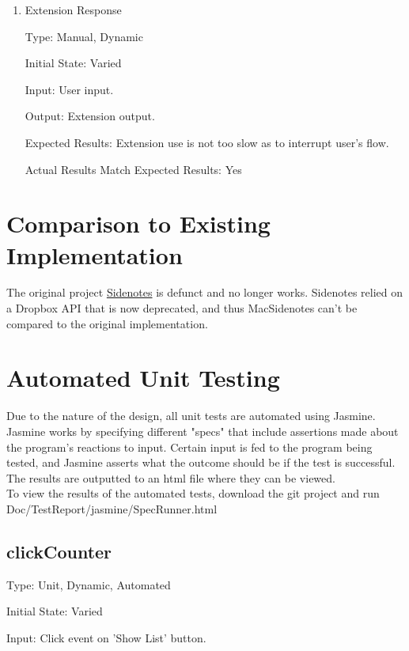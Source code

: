 \documentclass[12pt, titlepage]{article}
\begin{document}
\begin{enumerate}
	
	\item{Extension Response\\}
	
	Type: Manual, Dynamic
	
	Initial State: Varied
	
	Input: User input.
	
	Output: Extension output.
	
	Expected Results: Extension use is not too slow as to interrupt user's flow.
	
	Actual Results Match Expected Results: Yes
	
\end{enumerate}
	
\section{Comparison to Existing Implementation}	

The original project 
\href{https://github.com/sidenotes/sidenotes}{Sidenotes} is defunct and no 
longer works. Sidenotes relied on a Dropbox API that is now deprecated, and 
thus MacSidenotes can't be compared to the original implementation.

\section{Automated Unit Testing}

Due to the nature of the design, all unit tests are automated using Jasmine. 
Jasmine works by specifying different "specs" that include assertions made 
about the program's reactions to input. Certain input is fed to the program 
being tested, and Jasmine asserts what the outcome should be if the test is 
successful. The results are outputted to an html file where they can be 
viewed.\\
To view the results of the automated tests, download the git project and run 
Doc/TestReport/jasmine/SpecRunner.html



\subsection{clickCounter}

	Type: Unit, Dynamic, Automated

	Initial State: Varied

	Input: Click event on 'Show List' button.
\end{document}
